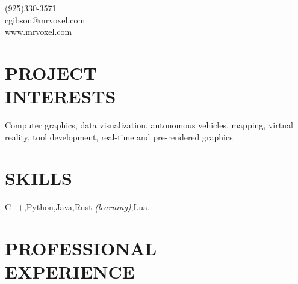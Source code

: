 \documentclass[margin,line]{resume}
\begin{document}
{
	\sc
    \hfill (925)330-3571                  \vspace{0mm}\\\vspace{0mm}%
    \hfill cgibson@mrvoxel.com            \vspace{0mm}\\\vspace{0mm}%
    \hfill www.mrvoxel.com                \vspace{0mm}\\\vspace{-10mm}%
}

\begin{resume}

\vspace{1mm}

    \section{\mysidestyle \textbf{\large{P}\small{ROJECT\\INTERESTS}}}

	Computer graphics, data visualization, autonomous vehicles, mapping, virtual reality, tool development, real-time and pre-rendered graphics

\sectionline

    \section{\mysidestyle \textbf{\large{S}\small{KILLS}}}

    C++,\hspace{2mm}Python,\hspace{2mm}Java,\hspace{2mm}Rust \textsl{\small(learning)},\hspace{2mm}Lua.


\sectionline

    \section{\mysidestyle \textbf{\large{P}\small{ROFESSIONAL\\EXPERIENCE}}}


\end{resume}
\end{document}

